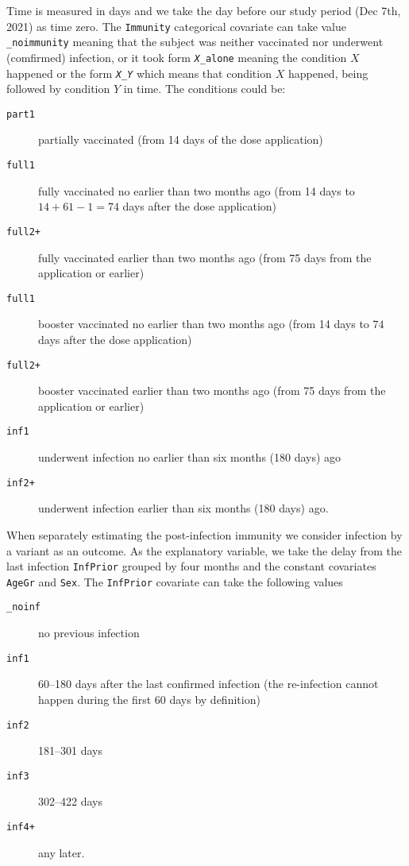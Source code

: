 \documentclass[preprint,12pt,authoryear]{elsarticle}
\begin{document}
Time is measured in days and we take the day before our study period (Dec 7th, 2021) as time zero. The {\tt Immunity} categorical covariate can take value {{\tt \_noimmunity}} meaning that the subject was neither vaccinated nor underwent (comfirmed) infection, or it took form {\tt {\em X}\_alone} meaning the condition $X$ happened or the form {\tt {\em X}\_{\em Y}} which means that condition $X$ happened, being followed by condition $Y$ in time. The conditions could be: 
\begin{description}
\item[{\tt part1}] partially vaccinated (from 14 days of the dose application)
\item[{\tt full1}] fully vaccinated no earlier than two months ago (from 14 days to $14+61-1=74$ days after the dose application)
\item[{\tt full2+}] fully vaccinated earlier than two months ago (from 75 days from the application or earlier)
\item[{\tt full1}] booster vaccinated no earlier than two months ago (from 14 days to $74$ days after the dose application)
\item[{\tt full2+}] booster vaccinated earlier than two months ago (from 75 days from the application or earlier)
\item[{\tt inf1}] underwent infection no earlier than six months (180 days) ago 
\item[{\tt inf2+}] underwent infection earlier than six months (180 days) ago. \end{description}

When separately estimating the post-infection immunity we consider infection by a variant as an outcome. As the explanatory variable, we take the delay from the last infection {\tt InfPrior} grouped by four months and the constant covariates {\tt AgeGr} and {\tt Sex}. The {\tt InfPrior} covariate can take the following values 
\begin{description}
\item[{\tt \_noinf}] no previous infection
\item[{\tt inf1}] 60--180 days after the last confirmed infection (the re-infection cannot happen during the first 60 days by definition)
\item[{\tt inf2}] 181--301 days 
\item[{\tt inf3}] 302--422 days 
\item[{\tt inf4+}] any later.
\end{description}
\end{document}
